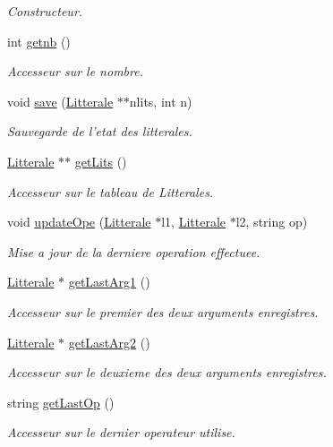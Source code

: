 \begin{CompactItemize}
\begin{CompactList}\small\item\em Constructeur. \item\end{CompactList}\item 
int \hyperlink{class_memento_e45233d8532ac8fbc47ed8b1e5f091f5}{getnb} ()
\begin{CompactList}\small\item\em Accesseur sur le nombre. \item\end{CompactList}\item 
void \hyperlink{class_memento_3b5cc6cc4611bb18ea52ef949f7b9430}{save} (\hyperlink{class_litterale}{Litterale} $\ast$$\ast$nlits, int n)
\begin{CompactList}\small\item\em Sauvegarde de l'etat des litterales. \item\end{CompactList}\item 
\hyperlink{class_litterale}{Litterale} $\ast$$\ast$ \hyperlink{class_memento_8d8c047f861706c999f8115fa16fd58f}{getLits} ()
\begin{CompactList}\small\item\em Accesseur sur le tableau de Litterales. \item\end{CompactList}\item 
void \hyperlink{class_memento_f8f177a9c75011e284897fc5febb14a0}{updateOpe} (\hyperlink{class_litterale}{Litterale} $\ast$l1, \hyperlink{class_litterale}{Litterale} $\ast$l2, string op)
\begin{CompactList}\small\item\em Mise a jour de la derniere operation effectuee. \item\end{CompactList}\item 
\hyperlink{class_litterale}{Litterale} $\ast$ \hyperlink{class_memento_a30492b498231a10ba8b546e72ee0540}{getLastArg1} ()
\begin{CompactList}\small\item\em Accesseur sur le premier des deux arguments enregistres. \item\end{CompactList}\item 
\hyperlink{class_litterale}{Litterale} $\ast$ \hyperlink{class_memento_3e41b8b940d028d9c35d7f2c26395144}{getLastArg2} ()
\begin{CompactList}\small\item\em Accesseur sur le deuxieme des deux arguments enregistres. \item\end{CompactList}\item 
string \hyperlink{class_memento_e0caadaf7cabf3c5904cd8416718c2bb}{getLastOp} ()
\begin{CompactList}\small\item\em Accesseur sur le dernier operateur utilise. \item\end{CompactList}\end{CompactItemize}
